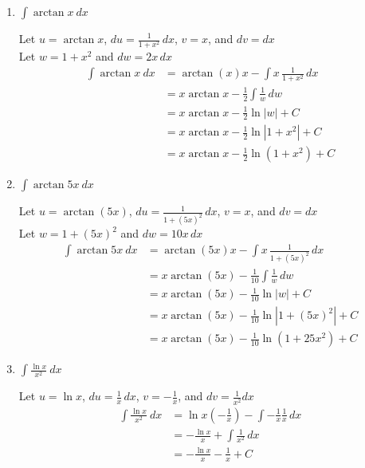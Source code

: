 \documentclass[12pt]{article}
\begin{document}
\begin{enumerate}
\item $\displaystyle\int \arctan x \ dx$

Let $u=\arctan x$, $\displaystyle du=\frac{1}{1+x^2}\,dx$, $v=x$, and $dv =dx$ \\
Let $w=1+x^2$ and $dw=2x\,dx$
\begin{equation*}
\begin{aligned}
\int \arctan x \ dx &= \arctan (x)x - \int x\,\frac{1}{1+x^2}\,dx \\
&= x\arctan x - \frac{1}{2}\int \frac{1}{w}\,dw \\
&= x\arctan x - \frac{1}{2} \ln |w| + C\\
&= x\arctan x - \frac{1}{2} \ln |1+x^2| + C\\
&= x\arctan x - \frac{1}{2} \ln (1+x^2) + C
\end{aligned}
\end{equation*}

\item $\displaystyle\int \arctan 5x \ dx$

Let $u=\arctan (5x)$, $\displaystyle du=\frac{1}{1+(5x) ^2}\,dx$, $v=x$, and $dv =dx$ \\
Let $w=1+(5x)^2$ and $dw=10x\,dx$
\begin{equation*}
\begin{aligned}
\int \arctan 5x \ dx &= \arctan (5x)x - \int x\,\frac{1}{1+(5x)^2}\,dx \\
&= x\arctan (5x) - \frac{1}{10}\int \frac{1}{w}\,dw \\
&= x\arctan (5x) - \frac{1}{10} \ln |w| + C\\
&= x\arctan (5x) - \frac{1}{10} \ln |1+(5x)^2| + C\\
&= x\arctan (5x) - \frac{1}{10} \ln (1+25x^2) + C
\end{aligned}
\end{equation*}

\item $\displaystyle\int \frac{\ln x}{x^2} \ dx$

Let $u=\ln x$, $\displaystyle du=\frac{1}{x}\,dx$, $v=\displaystyle-\frac{1}{x}$, and $dv =\displaystyle\frac{1}{x^2}dx$
\begin{equation*}
\begin{aligned}
\int \frac{\ln x}{x^2} \ dx &= \ln x \left(-\frac{1}{x}\right)  - \int -\frac{1}{x}\frac{1}{x}\,dx \\
&= -\frac{\ln x}{x} + \int \frac{1}{x^2}\,dx \\
&= -\frac{\ln x}{x} - \frac{1}{x}  + C
\end{aligned}
\end{equation*}


\end{enumerate}
\end{document}
